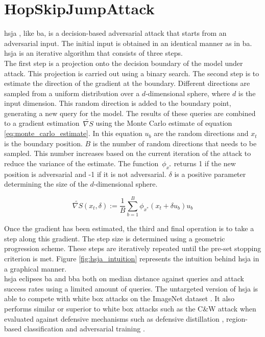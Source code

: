 \section{HopSkipJumpAttack}\label{sec:hsja}
\gls{hsja} \cite{hsja}, like \gls{ba}, is a decision-based adversarial attack that starts from an adversarial input. The initial input is obtained in an identical manner as in \gls{ba}. \gls{hsja} is an iterative algorithm that consists of three steps.\\

The first step is a projection onto the decision boundary of the model under attack. This projection is carried out using a binary search. The second step is to estimate the direction of the gradient at the boundary. Different directions are sampled from a uniform distribution over a $d$-dimensional sphere, where $d$ is the input dimension. This random direction is added to the boundary point, generating a new query for the model. The results of these queries are combined to a gradient estimation~$\widetilde{\nabla S}$ using the Monte Carlo estimate of equation \ref{eq:monte_carlo_estimate}. In this equation $u_b$ are the random directions and $x_t$ is the boundary position. $B$ is the number of random directions that needs to be sampled. This number increases based on the current iteration of the attack to reduce the variance of the estimate. The function~$\phi_{x^*}$ returns 1 if the new position is adversarial and -1 if it is not adversarial. $\delta$ is a positive parameter determining the size of the $d$-dimensional sphere.

\begin{equation}\label{eq:monte_carlo_estimate}
\widetilde{\nabla S}(x_t,\delta) := \frac{1}{B} \sum_{b=1}^{B}\phi_{x^*}(x_t + \delta u_b)u_b
\end{equation}

Once the gradient has been estimated, the third and final operation is to take a step along this gradient. The step size is determined using a geometric progression scheme. These steps are iteratively repeated until the pre-set stopping criterion is met. Figure \ref{fig:hsja_intuition} represents the intuition behind \gls{hsja} in a graphical manner.\\

\gls{hsja} eclipses \gls{ba} and \gls{bba} both on median distance against queries and attack success rates using a limited amount of queries. The untargeted version of \gls{hsja} is able to compete with white box attacks on the ImageNet dataset \cite{imagenet}. It also performs similar or superior to white box attacks such as the C\&W attack \cite{cw_attack} when evaluated against defensive mechanisms such as defensive distillation \cite{defensive_distillation}, region-based classification \cite{region-based_classification} and adversarial training \cite{FGSM}.


